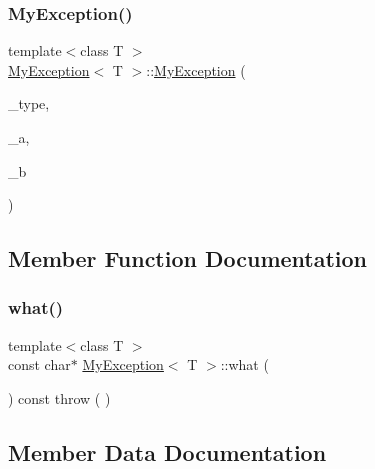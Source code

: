 \subsubsection{\texorpdfstring{MyException()}{MyException()}}
{\footnotesize\ttfamily template$<$class T $>$ \\
\mbox{\hyperlink{class_my_exception}{My\+Exception}}$<$ T $>$\+::\mbox{\hyperlink{class_my_exception}{My\+Exception}} (\begin{DoxyParamCaption}\item[{\mbox{\hyperlink{utils_8hh_af26a5d951fd6ab4b44e6cd8425aa0383}{E\+X\+C\+E\+P\+T\+I\+O\+N\+\_\+\+T\+Y\+PE}}}]{\+\_\+type,  }\item[{T}]{\+\_\+a,  }\item[{\mbox{\hyperlink{draw_8hh_aa620a13339ac3a1177c86edc549fda9b}{int}}}]{\+\_\+b }\end{DoxyParamCaption})\hspace{0.3cm}{\ttfamily [inline]}}



\subsection{Member Function Documentation}
\mbox{\label{class_my_exception_ad0a4ef3c9897eb136fa37aec342406fd}} 
\subsubsection{\texorpdfstring{what()}{what()}}
{\footnotesize\ttfamily template$<$class T $>$ \\
const char$\ast$ \mbox{\hyperlink{class_my_exception}{My\+Exception}}$<$ T $>$\+::what (\begin{DoxyParamCaption}{ }\end{DoxyParamCaption}) const throw ( ) \hspace{0.3cm}{\ttfamily [inline]}}



\subsection{Member Data Documentation}
\mbox{\label{class_my_exception_ae4b514f28c88dc08e7a27bc04f3b4655}} 
